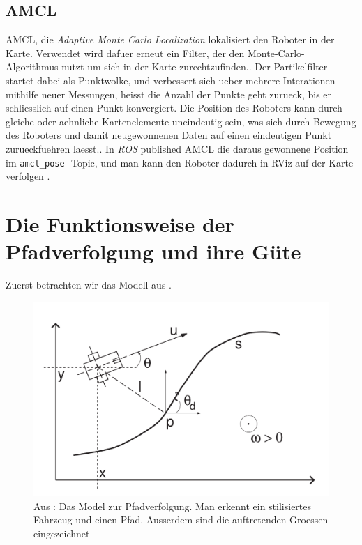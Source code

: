 \documentclass[11pt,a4paper]{article}
\begin{document}
\subsection*{AMCL}
AMCL, die \textit{Adaptive Monte Carlo Localization} lokalisiert den Roboter in der Karte. Verwendet wird dafuer erneut ein 
Filter, der den Monte-Carlo-Algorithmus nutzt um sich in der Karte zurechtzufinden.\cite{website:oreillyamcl}. 
Der Partikelfilter startet dabei als Punktwolke, und verbessert sich ueber mehrere Interationen mithilfe neuer Messungen, heisst die Anzahl der Punkte geht zurueck,
bis er schliesslich auf einen Punkt konvergiert. 
Die Position des Roboters kann durch gleiche oder aehnliche Kartenelemente uneindeutig sein, was sich durch Bewegung des Roboters und 
damit neugewonnenen Daten auf einen eindeutigen Punkt zurueckfuehren laesst.\cite{fox1999monte}. In \textit{ROS} published AMCL die daraus gewonnene Position im \verb+amcl_pose+-
Topic, und man kann den Roboter dadurch in RViz auf der Karte verfolgen \cite{website:amcl}.


\section{Die Funktionsweise der Pfadverfolgung und ihre Güte}

Zuerst betrachten wir das Modell aus \cite{INDIVERI2004185}.

\begin{figure}[ht]
  \centering
  \includegraphics[scale = 0.3]{model.png}
  \caption{Aus \cite{INDIVERI2004185}: Das Model zur Pfadverfolgung. Man erkennt ein stilisiertes Fahrzeug und einen Pfad. Ausserdem sind die auftretenden Groessen eingezeichnet}
  \label{fig: ModelPfadverfolgung}
  \end{figure}
\end{document}
